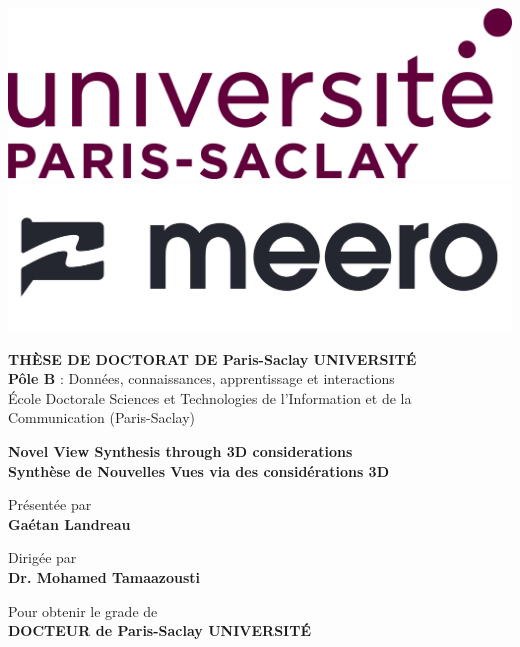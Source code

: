 \begin{titlepage}

  \vspace*{-2.5cm}
  \includegraphics[height=0.15\columnwidth]{images/saclay.png}
  \hspace*{2.5cm}
  \includegraphics[height=0.10\columnwidth]{images/meero.jpg}
  \vspace*{0.5cm}

  \begin{center}

    {\large \textbf{T\normalsize{HÈSE DE}\large{} D\normalsize{OCTORAT DE}\large{} P\normalsize{aris}\large{}-S\normalsize{aclay}\large{} U\normalsize{NIVERSITÉ}}}\\
    \textbf{Pôle B} : Données, connaissances, apprentissage et interactions \\
    École Doctorale Sciences et Technologies de l'Information et de la Communication (Paris-Saclay)

    \vspace*{1.5cm}

    {\Large \textbf{Novel View Synthesis through 3D considerations}} \\[0.5em]
    {\large \textbf{Synthèse de Nouvelles Vues via des considérations 3D}}

    \vspace*{1.2cm}

    Présentée par\\
    {\large \textbf{Gaétan {Landreau}}}

    \vspace*{2mm}

    Dirigée par\\
    \textbf{Dr. Mohamed {Tamaazousti}}

    \vspace*{5mm}

    Pour obtenir le grade de \ \\
    \textbf{DOCTEUR de Paris-Saclay UNIVERSITÉ} \ \\

    \vspace*{5mm}


\end{center}
\end{titlepage}

